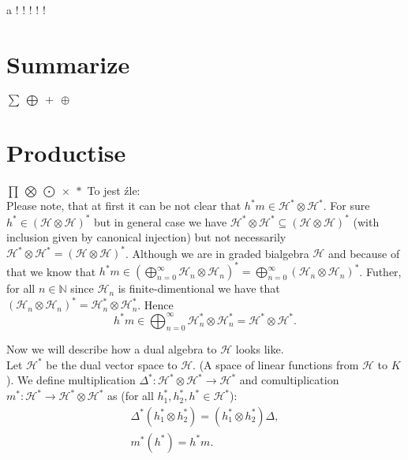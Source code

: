 \documentclass[a4paper]{article}
\begin{document}
a ! \large! \Large! \huge! \Huge! \normalsize

\section{Summarize}
$\displaystyle\sum\ \bigoplus\ +\ \oplus$

\section{Productise}
$\displaystyle\prod\ \bigotimes\ \bigodot\ \times\ *$
\hfill \break
To jest źle: \\
Please note, that at first it can be not clear that $h^*m \in \mathcal{H}^* \otimes \mathcal{H}^*$. 
For sure $h^* \in (\mathcal{H} \otimes \mathcal{H})^*$ but in general case we have 
$ \mathcal{H}^* \otimes \mathcal{H}^* \subseteq (\mathcal{H} \otimes \mathcal{H})^*$ (with inclusion given by 
canonical injection) but not necessarily 
$ \mathcal{H}^* \otimes \mathcal{H}^* = (\mathcal{H} \otimes \mathcal{H})^*$.
Although we are in graded bialgebra $\mathcal{H}$ and because of that we know that 
$h^*m \in \displaystyle\left(\bigoplus^\infty_{n=0}\mathcal{H}_n \otimes \mathcal{H}_n\right)^* = 
\displaystyle\bigoplus^\infty_{n = 0} (\mathcal{H}_n \otimes \mathcal{H}_n)^*$. Futher, for all 
$n \in \mathbb{N}$ since $\mathcal{H}_n$ is finite-dimentional we have that
$(\mathcal{H}_n \otimes \mathcal{H}_n)^* = \mathcal{H}_n^* \otimes \mathcal{H}_n^*$. 
Hence 
\begin{equation*}
h^*m \in \displaystyle\bigoplus^\infty_{n = 0} \mathcal{H}_n^* \otimes \mathcal{H}^*_n = 
\mathcal{H}^* \otimes \mathcal{H}^*.
\end{equation*}

Now we will describe how a dual algebra to $\mathcal{H}$ looks like. \\
Let $\mathcal{H}^*$ be the dual vector space to $\mathcal{H}$. (A space of linear functions from 
$\mathcal{H}$ to $K$). We define multiplication 
$\Delta^* : \mathcal{H}^* \otimes \mathcal{H}^* \to \mathcal{H}^*$ and comultiplication 
$m^* : \mathcal{H}^* \to \mathcal{H}^* \otimes \mathcal{H}^*$ as 
(for all $h_1^*, h_2^*, h^* \in \mathcal{H}^*$):
\begin{align*}
\Delta^*(h_1^* \otimes h_2^*) = (h_1^* \otimes h_2^*)\Delta, \\
m^*(h^*) = h^*m.
\end{align*}
\end{document}
